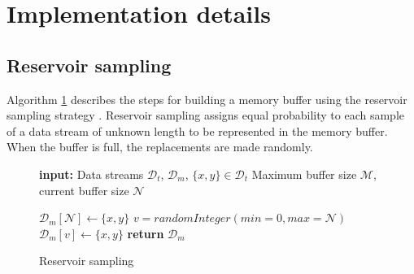 \documentclass{article} %
\begin{document}
\section{Implementation details}\label{implementation_details}

\subsection{Reservoir sampling}
Algorithm \ref{alg:reservoir} describes the steps for building a memory buffer using the reservoir sampling strategy \citep{vitter1985random}. Reservoir sampling assigns equal probability to
each sample of a data stream of unknown length to be represented in the memory buffer. When the buffer is full, the replacements are made randomly. 


\begin{figure}[!t]
\begin{algorithm}[H]
\caption{Reservoir sampling \citep{vitter1985random}}
\label{alg:reservoir}
\begin{algorithmic}[1]
    \Statex \textbf{input:} Data streams $\mathcal{D}_{t}$, $\mathcal{D}_{m}$,  $\{x, y\} \in \mathcal{D}_{t}$ 
     \Statex Maximum buffer size $\mathcal{M}$, current buffer size $\mathcal{N}$ 
        
       \State  $\mathcal{D}_{m}[\mathcal{N}] \leftarrow \{x, y\}$
        \Else
         \State $v = randomInteger(min = 0, max = \mathcal{N})$
         \State $\mathcal{D}_{m}[v] \leftarrow \{x, y\}$
         \EndIf
        \EndIf
        \State \textbf{return} $\mathcal{D}_{m}$
    \end{algorithmic}
    \end{algorithm}

\end{figure}
\end{document}
